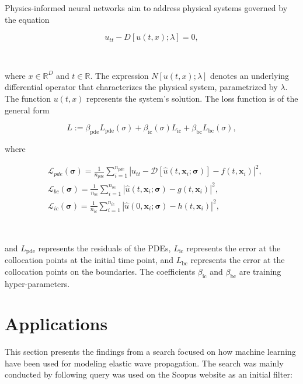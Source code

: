 \documentclass[11pt,twoside]{article}
\begin{document}
Physics-informed neural networks aim to address physical systems governed by the equation

$$
u_{tt} - D[u(t, x); \lambda] = 0,
$$

\

where \(x \in \mathbb{R}^D\) and \(t \in \mathbb{R}\). The expression \(N[u(t, x); \lambda]\) denotes an underlying differential operator that characterizes the physical system, parametrized by \(\lambda\). The function \(u(t, x)\) represents the system's solution. The loss function is of the general form 

$$ L := \beta_{\text{pde}}L_{\text{pde}}(\sigma) + \beta_{\text{ic}}(\sigma) L_{\text{ic}} + \beta_{\text{bc}} L_{\text{bc}}(\sigma) ,$$

where

$$
\begin{aligned}
& \mathcal{L}_{pde}(\boldsymbol{\sigma})=\frac{1}{n_{pde}} \sum_{i=1}^{n_{pde}}\left|u_{tt} - \mathcal{D}\left[\hat{u}\left(t, \boldsymbol{x}_i ; \boldsymbol{\sigma}\right)\right]-f\left(t, \boldsymbol{x}_i\right)\right|^2, \\
& \mathcal{L}_{bc}(\boldsymbol{\sigma})=\frac{1}{n_{bc}} \sum_{i=1}^{n_{bc}}\left|\hat{u}\left(t, \boldsymbol{x}_i ; \boldsymbol{\sigma}\right)-g\left(t, \boldsymbol{x}_i\right)\right|^2, \\
& \mathcal{L}_{ic}(\boldsymbol{\sigma})=\frac{1}{n_{ic}} \sum_{i=1}^{n_{ic}}\left|\hat{u}\left(0, \boldsymbol{x}_i ; \boldsymbol{\sigma}\right)-h\left(t,\boldsymbol{x}_i\right)\right|^2,
\end{aligned}
$$

\

and \( L_{\text{pde}} \) represents the residuals of the PDEs, \( L_{\text{ic}} \) represents the error at the collocation points at the initial time point, and \( L_{\text{bc}} \) represents the error at the collocation points on the boundaries. The coefficients \(\beta_{\text{ic}}\) and \(\beta_{\text{bc}}\) are training hyper-parameters.

\section{Applications}

This section presents the findings from a search focused on how machine learning have been used for modeling elastic wave propagation. The search was mainly conducted by following query was used on the Scopus website as an initial filter:
\end{document}
